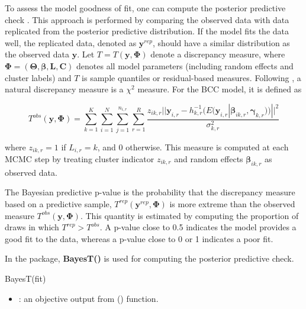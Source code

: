 To assess the model goodness of fit, one can compute the posterior predictive check \citep{Gelman1996}. This approach is performed by comparing the observed data with data replicated from the posterior predictive distribution. If the model fits the data well, the replicated data, denoted as $\boldsymbol{y}^{rep}$, should have a similar distribution as the observed data $\boldsymbol{y}$. Let $T = T(\boldsymbol{y},\boldsymbol{\Phi})$ denote a discrepancy measure, where $\boldsymbol{\Phi} = (\boldsymbol{\Theta}, \boldsymbol{\beta}, \boldsymbol{L}, \boldsymbol{C})$ denotes all model parameters (including random effects and cluster labels) and $T$ is sample quantiles or residual-based measures. Following \citet{Gelman1996}, a natural discrepancy measure is a $\chi^2$ measure. For the BCC model, it is defined as 

\begin{equation}

T^{obs}(\boldsymbol{y},\boldsymbol{\Phi})= \sum^K_{k=1} \sum_{i=1}^N \sum_{j=1}^{n_{i,r}}   \sum_{r=1}^R \frac{ z_{ik,r} ||\boldsymbol{y}_{i,r} - h^{-1}_{k,r}(E(\boldsymbol{y}_{i,r}|\boldsymbol{\beta}_{ik,r},\boldsymbol{\gamma}_{k,r}))||^2}{\sigma_{k,r}^2} 

\end{equation}

where $z_{ik,r} = 1$ if $L_{i,r}=k$, and 0 otherwise. This measure is computed at each MCMC step by treating cluster indicator $z_{ik,r}$ and random effects $\boldsymbol{\beta}_{ik,r}$ as observed data.

The Bayesian predictive p-value is the probability that the discrepancy measure based on a predictive sample, $ T^{rep}(\boldsymbol{y}^{rep},\boldsymbol{\Phi})$ is more extreme than the observed measure $T^{obs}(\boldsymbol{y},\boldsymbol{\Phi})$. This quantity is estimated by computing the proportion of draws in which $T^{rep} > T^{obs}$. A p-value close to 0.5 indicates the model provides a good fit to the data, whereas a p-value close to 0 or 1 indicates a poor fit.

In the  package, \textbf{BayesT()} is used for computing the posterior predictive check. 

\begin{example}

BayesT(fit)

\end{example}

\begin{itemize}

	\item {}: an objective output from () function.  

\end{itemize}

